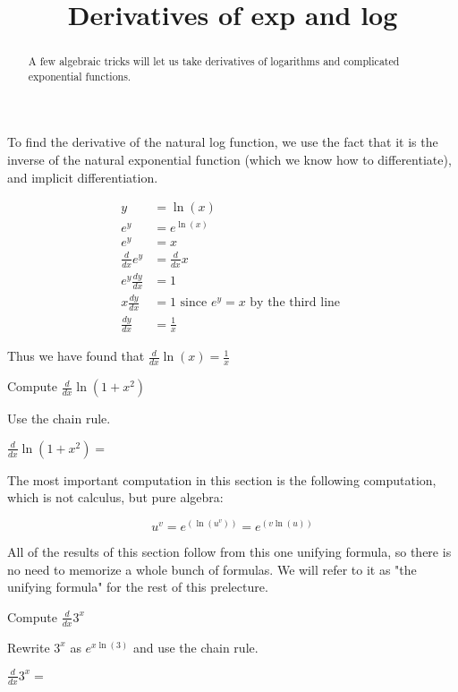 \documentclass{ximera}
\title{Derivatives of exp and log}
\begin{document}
\begin{abstract}
  A few algebraic tricks will let us take derivatives of logarithms and complicated exponential functions.
\end{abstract}

\maketitle

To find the derivative of the natural log function, we use the fact
that it is the inverse of the natural exponential function (which we
know how to differentiate), and implicit differentiation.

\begin{align*}
y&=\ln(x)\\
e^y &= e^{\ln(x)}\\
e^y &= x\\                      
\frac{d}{dx} e^y &= \frac{d}{dx} x\\
e^y\frac{dy}{dx} &= 1\\
x\frac{dy}{dx} &= 1 \text{ since $e^y=x$ by the third line }\\
\frac{dy}{dx} &= \frac{1}{x}
\end{align*}

Thus we have found that $\frac{d}{dx} \ln(x) = \frac{1}{x}$

\begin{question}
	Compute $\frac{d}{dx} \ln(1+x^2)$
	\begin{hint}
	  Use the chain rule.
	\end{hint}
	$\frac{d}{dx} \ln(1+x^2)=$
\end{question}

The most important computation in this section is the following computation, which is not  calculus, but pure algebra:

\[
u^v = e^(\ln(u^v)) = e^(v\ln(u))
\]

All of the results of this section follow from this one unifying formula, so there is no need to memorize a whole bunch of formulas.   We will refer to it as "the unifying formula" for the rest of this prelecture.


\begin{question}
  Compute $\frac{d}{dx} 3^x $
  \begin{hint}
    Rewrite $3^x$ as $e^{x\ln(3)}$ and use the chain rule.
  \end{hint}
  $\frac{d}{dx} 3^x =$  
\end{question}
\end{document}
